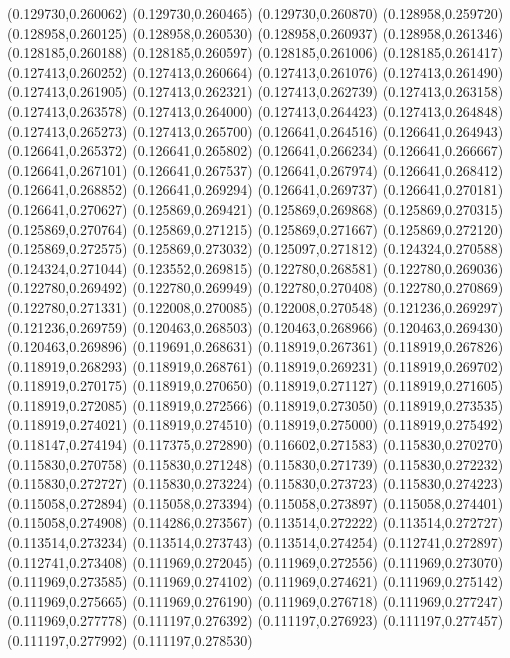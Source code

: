 (0.129730,0.260062)
(0.129730,0.260465)
(0.129730,0.260870)
(0.128958,0.259720)
(0.128958,0.260125)
(0.128958,0.260530)
(0.128958,0.260937)
(0.128958,0.261346)
(0.128185,0.260188)
(0.128185,0.260597)
(0.128185,0.261006)
(0.128185,0.261417)
(0.127413,0.260252)
(0.127413,0.260664)
(0.127413,0.261076)
(0.127413,0.261490)
(0.127413,0.261905)
(0.127413,0.262321)
(0.127413,0.262739)
(0.127413,0.263158)
(0.127413,0.263578)
(0.127413,0.264000)
(0.127413,0.264423)
(0.127413,0.264848)
(0.127413,0.265273)
(0.127413,0.265700)
(0.126641,0.264516)
(0.126641,0.264943)
(0.126641,0.265372)
(0.126641,0.265802)
(0.126641,0.266234)
(0.126641,0.266667)
(0.126641,0.267101)
(0.126641,0.267537)
(0.126641,0.267974)
(0.126641,0.268412)
(0.126641,0.268852)
(0.126641,0.269294)
(0.126641,0.269737)
(0.126641,0.270181)
(0.126641,0.270627)
(0.125869,0.269421)
(0.125869,0.269868)
(0.125869,0.270315)
(0.125869,0.270764)
(0.125869,0.271215)
(0.125869,0.271667)
(0.125869,0.272120)
(0.125869,0.272575)
(0.125869,0.273032)
(0.125097,0.271812)
(0.124324,0.270588)
(0.124324,0.271044)
(0.123552,0.269815)
(0.122780,0.268581)
(0.122780,0.269036)
(0.122780,0.269492)
(0.122780,0.269949)
(0.122780,0.270408)
(0.122780,0.270869)
(0.122780,0.271331)
(0.122008,0.270085)
(0.122008,0.270548)
(0.121236,0.269297)
(0.121236,0.269759)
(0.120463,0.268503)
(0.120463,0.268966)
(0.120463,0.269430)
(0.120463,0.269896)
(0.119691,0.268631)
(0.118919,0.267361)
(0.118919,0.267826)
(0.118919,0.268293)
(0.118919,0.268761)
(0.118919,0.269231)
(0.118919,0.269702)
(0.118919,0.270175)
(0.118919,0.270650)
(0.118919,0.271127)
(0.118919,0.271605)
(0.118919,0.272085)
(0.118919,0.272566)
(0.118919,0.273050)
(0.118919,0.273535)
(0.118919,0.274021)
(0.118919,0.274510)
(0.118919,0.275000)
(0.118919,0.275492)
(0.118147,0.274194)
(0.117375,0.272890)
(0.116602,0.271583)
(0.115830,0.270270)
(0.115830,0.270758)
(0.115830,0.271248)
(0.115830,0.271739)
(0.115830,0.272232)
(0.115830,0.272727)
(0.115830,0.273224)
(0.115830,0.273723)
(0.115830,0.274223)
(0.115058,0.272894)
(0.115058,0.273394)
(0.115058,0.273897)
(0.115058,0.274401)
(0.115058,0.274908)
(0.114286,0.273567)
(0.113514,0.272222)
(0.113514,0.272727)
(0.113514,0.273234)
(0.113514,0.273743)
(0.113514,0.274254)
(0.112741,0.272897)
(0.112741,0.273408)
(0.111969,0.272045)
(0.111969,0.272556)
(0.111969,0.273070)
(0.111969,0.273585)
(0.111969,0.274102)
(0.111969,0.274621)
(0.111969,0.275142)
(0.111969,0.275665)
(0.111969,0.276190)
(0.111969,0.276718)
(0.111969,0.277247)
(0.111969,0.277778)
(0.111197,0.276392)
(0.111197,0.276923)
(0.111197,0.277457)
(0.111197,0.277992)
(0.111197,0.278530)
